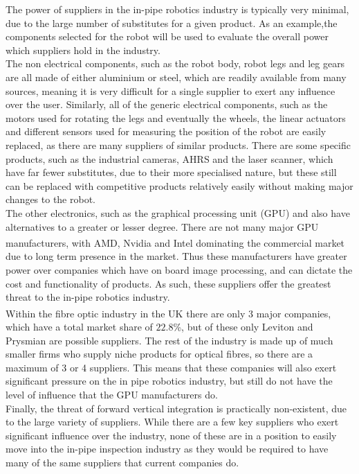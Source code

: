 \documentclass[11pt]{article}		%
\newcommand{\supercite}[1]{\textsuperscript{\cite{#1}}}		%
\begin{document}
			The power of suppliers in the in-pipe robotics industry is typically very minimal, due to the large number of substitutes for a given product.
			As an example,the components selected for the robot will be used to evaluate the overall power which suppliers hold in the industry.
			\\
			The non electrical components, such as the robot body, robot legs and leg gears are all made of either aluminium or steel, which are readily available from many sources, meaning it is very difficult for a single supplier to exert any influence over the user.
			Similarly, all of the generic electrical components, such as the motors used for rotating the legs and eventually the wheels, the linear actuators and different sensors used for measuring the position of the robot are easily replaced, as there are many suppliers of similar products.
			There are some specific products, such as the industrial cameras, AHRS and the laser scanner, which have far fewer substitutes, due to their more specialised nature, but these still can be replaced with competitive products relatively easily without making major changes to the robot.
			\\
			The other electronics, such as the graphical processing unit (GPU) and  also have alternatives to a greater or lesser degree.
			There are not many major GPU manufacturers, with AMD, Nvidia and Intel dominating the commercial market\supercite{rake2020graphic} due to long term presence in the market.
			Thus these manufacturers have greater power over companies which have on board image processing, and can dictate the cost and functionality of  products.
			As such, these suppliers offer the greatest threat to the in-pipe robotics industry.
			\\
			Within the fibre optic industry in the UK there are only 3 major companies\supercite{neve2020fibreoptic}, which have a total market share of $22.8$\%, but of these only Leviton and Prysmian are possible suppliers.
			The rest of the industry is made up of much smaller firms who supply niche products for optical fibres, so there are a maximum of 3 or 4 suppliers.
			This means that these companies will also exert significant pressure on the in pipe robotics industry, but still do not have the level of influence that the GPU manufacturers do.
			\\
			Finally, the threat of forward vertical integration is practically non-existent, due to the large variety of suppliers.
			While there are a few key suppliers who exert significant influence over the industry, none of these are in a position to easily move into the in-pipe inspection industry as they would be required to have many of the same suppliers that current companies do.
					
\end{document}

